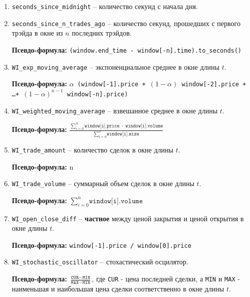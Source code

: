 \begin{enumerate}
    \item \texttt{seconds\_since\_midnight} -- количество секунд с начала дня.
    \item \texttt{seconds\_since\_n\_trades\_ago} -- количество секунд, прошедших с первого трэйда в окне из $n$ последних трэйдов.
    
    \textbf{Псевдо-формула:} \texttt{(window.end\_time - window[-n].time).to\_seconds()}

    \item \texttt{WI\_exp\_moving\_average} -- экспоненциальное среднее в окне длины $t$. 
    
    \textbf{Псевдо-формула:} \texttt{$\alpha$ (window[-1].price + $(1 - \alpha)$ window[-2].price + \dots + $(1 - \alpha)^{n - 1}$ window[-n].price)}

    \item \texttt{WI\_weighted\_moving\_average} -- взвешанное среднее в окне длины $t$.

    \textbf{Псевдо-формула:} $\frac{\sum\limits_{i=0}^{n} \texttt{window[i].price} \; \cdot \; \texttt{window[i].volume}}{\sum\limits_{i=0}^{n}\texttt{window[i].size}}$

    \item \texttt{WI\_trade\_amount} -- количество сделок в окне длины $t$.

    \textbf{Псевдо-формула:} n

    \item \texttt{WI\_trade\_volume} -- суммарный объем сделок в окне длины $t$.

    \textbf{Псевдо-формула:} $\sum\limits_{i=0}^{n}\texttt{window[i].volume}$

    \item \texttt{WI\_open\_close\_diff} -- \textbf{частное} между ценой закрытия и ценой открытия в окне длины $t$.

    \textbf{Псевдо-формула:} \texttt{window[-1].price / window[0].price}

    \item \texttt{WI\_stochastic\_oscillator} -- стохастический осцилятор.

    \textbf{Псевдо-формула:} $\frac{\texttt{CUR} - \texttt{MIN}}{\texttt{MAX} - \texttt{MIN}}$, где \texttt{CUR} - цена последней сделки, а \texttt{MIN} и \texttt{MAX} - наименьшая и наибольшая цена сделки соответственно в окне длины $t$.

\end{enumerate}

